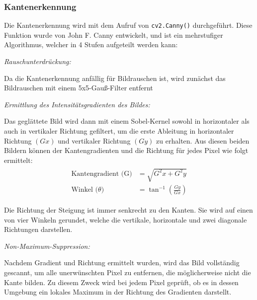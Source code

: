 \subsubsection{Kantenerkennung \label{sec:anpr:kantenerkennung}}
Die Kantenerkennung wird mit dem Aufruf von \verb|cv2.Canny()| durchgeführt. Diese Funktion wurde von John F. Canny entwickelt, und ist ein mehrstufiger Algorithmus, welcher in 4 Stufen aufgeteilt werden kann:
\begin{compactenum}
    \item \textit{Rauschunterdrückung: }
    \begin{compactenum}
        \item Da die Kantenerkennung anfällig für Bildrauschen ist, wird zunächst das Bildrauschen mit einem 5x5-Gauß-Filter entfernt
    \end{compactenum}
    \item \textit{Ermittlung des Intensitätsgradienten des Bildes: }
    \begin{compactenum}
        \item  Das geglättete Bild wird dann mit einem Sobel-Kernel sowohl in horizontaler als auch in vertikaler Richtung gefiltert, um die erste Ableitung in horizontaler Richtung \((Gx)\) und vertikaler Richtung \((Gy)\) zu erhalten. Aus diesen beiden Bildern können der Kantengradienten und die Richtung für jedes Pixel wie folgt ermittelt:
        \begin{equation}
            \begin{split}
                \begin{aligned}
                    \text{Kantengradient (G)} &= \sqrt{G^2x+G^2y}\\
                    \text{Winkel (\(\theta\))} &= \tan^{-1}(\frac{Gy}{Gx})
                \end{aligned}
            \end{split}
        \end{equation}
        \item Die Richtung der Steigung ist immer senkrecht zu den Kanten. Sie wird auf einen von vier Winkeln gerundet, welche die vertikale, horizontale und zwei diagonale Richtungen darstellen.
    \end{compactenum}
    \item \textit{Non-Maximum-Suppression: }
    \begin{compactenum}
        \item Nachdem Gradient und Richtung ermittelt wurden, wird das Bild vollständig gescannt, um alle unerwünschten Pixel zu entfernen, die möglicherweise nicht die Kante bilden. Zu diesem Zweck wird bei jedem Pixel geprüft, ob es in dessen Umgebung ein lokales Maximum in der Richtung des Gradienten darstellt.

\end{compactenum}
\end{compactenum}
